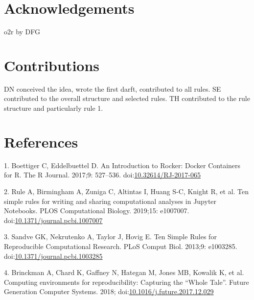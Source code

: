\documentclass[10pt,letterpaper]{article}
\begin{document}
\hypertarget{acknowledgements}{%
\section*{Acknowledgements}\label{acknowledgements}}

o2r by DFG

\hypertarget{contributions}{%
\section*{Contributions}\label{contributions}}

DN conceived the idea, wrote the first darft, contributed to all rules.
SE contributed to the overall structure and selected rules. TH
contributed to the rule structure and particularly rule 1.

\hypertarget{references}{%
\section*{References}\label{references}}

\hypertarget{refs}{}
\leavevmode\hypertarget{ref-boettiger_introduction_2017}{}%
1. Boettiger C, Eddelbuettel D. An Introduction to Rocker: Docker
Containers for R. The R Journal. 2017;9: 527--536.
doi:\href{https://doi.org/10.32614/RJ-2017-065}{10.32614/RJ-2017-065}

\leavevmode\hypertarget{ref-rule_ten_2019}{}%
2. Rule A, Birmingham A, Zuniga C, Altintas I, Huang S-C, Knight R, et
al. Ten simple rules for writing and sharing computational analyses in
Jupyter Notebooks. PLOS Computational Biology. 2019;15: e1007007.
doi:\href{https://doi.org/10.1371/journal.pcbi.1007007}{10.1371/journal.pcbi.1007007}

\leavevmode\hypertarget{ref-sandve_ten_2013}{}%
3. Sandve GK, Nekrutenko A, Taylor J, Hovig E. Ten Simple Rules for
Reproducible Computational Research. PLoS Comput Biol. 2013;9: e1003285.
doi:\href{https://doi.org/10.1371/journal.pcbi.1003285}{10.1371/journal.pcbi.1003285}

\leavevmode\hypertarget{ref-brinckman_computing_2018}{}%
4. Brinckman A, Chard K, Gaffney N, Hategan M, Jones MB, Kowalik K, et
al. Computing environments for reproducibility: Capturing the ``Whole
Tale''. Future Generation Computer Systems. 2018;
doi:\href{https://doi.org/10.1016/j.future.2017.12.029}{10.1016/j.future.2017.12.029}
\end{document}
